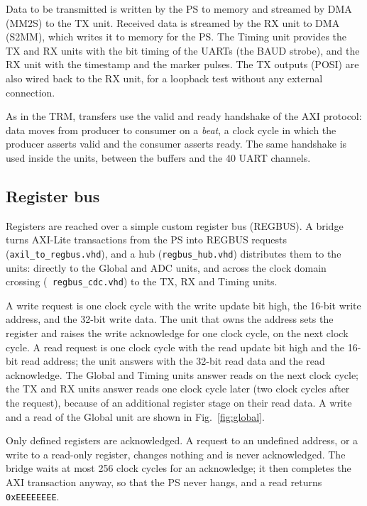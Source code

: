 \documentclass[12pt]{article}
\newcommand{\hex}[1]{\texttt{0x#1}}
\begin{document}
Data to be transmitted is written by the PS to memory and streamed by DMA (MM2S) to the TX unit.  Received
data is streamed by the RX unit to DMA (S2MM), which writes it to memory for the PS.  The Timing unit
provides the TX and RX units with the bit timing of the UARTs (the BAUD strobe), and the RX unit with the
timestamp and the marker pulses.  The TX outputs (POSI) are also wired back to the RX unit, for a loopback
test without any external connection.

As in the TRM, transfers use the valid and ready handshake of the AXI protocol: data moves from producer
to consumer on a {\em beat}, a clock cycle in which the producer asserts valid and the consumer asserts
ready.  The same handshake is used inside the units, between the buffers and the 40 UART channels.

\subsection{Register bus}

Registers are reached over a simple custom register bus (REGBUS).  A bridge turns AXI-Lite transactions from
the PS into REGBUS requests ({\tt axil\_to\_regbus.vhd}), and a hub ({\tt regbus\_hub.vhd}) distributes
them to the units: directly to the Global and ADC units, and across the clock domain crossing ({\tt
  regbus\_cdc.vhd}) to the TX, RX and Timing units.

A write request is one clock cycle with the write update bit high, the 16-bit write address, and the 32-bit
write data.  The unit that owns the address sets the register and raises the write acknowledge for one
clock cycle, on the next clock cycle.  A read request is one clock cycle with the read update bit high and
the 16-bit read address; the unit answers with the 32-bit read data and the read acknowledge.  The Global and
Timing units answer reads on the next clock cycle; the TX and RX units answer reads one clock cycle later
(two clock cycles after the request), because of an additional register stage on their read data.  A write
and a read of the Global unit are shown in Fig.~\ref{fig:global}.

Only defined registers are acknowledged.  A request to an undefined address, or a write to a read-only
register, changes nothing and is never acknowledged.  The bridge waits at most 256 clock cycles for an
acknowledge; it then completes the AXI transaction anyway, so that the PS never hangs, and a read returns
\hex{EEEEEEEE}.
\end{document}
